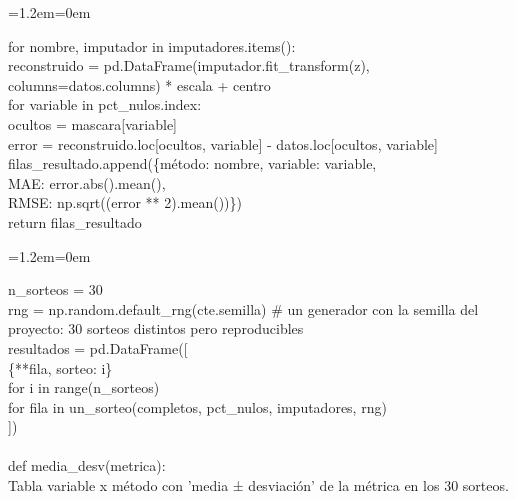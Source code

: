 \documentclass[11pt,a4paper]{article}
\newenvironment{codigo}
  {\par\smallskip\begin{list}{}{\leftmargin=1.2em\rightmargin=0em}\item\relax\ttfamily\scriptsize\raggedright}
  {\end{list}\smallskip}
\begin{document}
{\begin{codigo}
\hspace*{2.08em}for nombre, imputador in imputadores.items(): \\{}
\hspace*{4.16em}reconstruido = pd.DataFrame(imputador.fit\_\allowbreak{}transform(z), columns=datos.columns) * escala + centro \\{}
\hspace*{4.16em}for variable in pct\_\allowbreak{}nulos.index: \\{}
\hspace*{6.24em}ocultos = mascara[variable] \\{}
\hspace*{6.24em}error = reconstruido.loc[ocultos, variable] - datos.loc[ocultos, variable] \\{}
\hspace*{6.24em}filas\_\allowbreak{}resultado.append(\{\textquotedbl{}método\textquotedbl{}: nombre, \textquotedbl{}variable\textquotedbl{}: variable, \\{}
\hspace*{18.72em}\textquotedbl{}MAE\textquotedbl{}: error.abs().mean(), \\{}
\hspace*{18.72em}\textquotedbl{}RMSE\textquotedbl{}: np.sqrt((error ** 2).mean())\}) \\{}
\hspace*{2.08em}return filas\_\allowbreak{}resultado
\end{codigo}
\begin{codigo}
n\_\allowbreak{}sorteos = 30 \\{}
rng = np.random.default\_\allowbreak{}rng(cte.semilla)   \# un generador con la semilla del proyecto: 30 sorteos distintos pero reproducibles \\{}
resultados = pd.DataFrame([ \\{}
\hspace*{2.08em}\{**fila, \textquotedbl{}sorteo\textquotedbl{}: i\} \\{}
\hspace*{2.08em}for i in range(n\_\allowbreak{}sorteos) \\{}
\hspace*{2.08em}for fila in un\_\allowbreak{}sorteo(completos, pct\_\allowbreak{}nulos, imputadores, rng) \\{}
]) \\{}
\mbox{} \\{}
def media\_\allowbreak{}desv(metrica): \\{}
\hspace*{2.08em}\textquotedbl{}\textquotedbl{}\textquotedbl{}Tabla variable x método con 'media ± desviación' de la métrica en los 30 sorteos.\textquotedbl{}\textquotedbl{}\textquotedbl{} \\{}

\end{codigo}}
\end{document}
